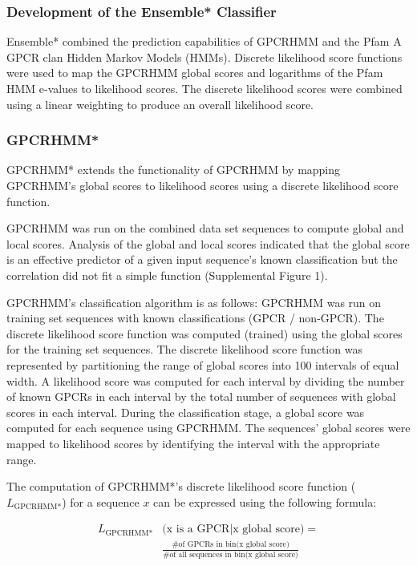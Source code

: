 \subsubsection{Development of the Ensemble* Classifier}

Ensemble* combined the prediction capabilities of GPCRHMM and the Pfam A GPCR clan Hidden Markov Models (HMMs).
Discrete likelihood score functions were used to map the GPCRHMM global scores and logarithms of the Pfam HMM e-values to likelihood scores.
The discrete likelihood scores were combined using a linear weighting to produce an overall likelihood score.

\subsubsection{GPCRHMM*}
GPCRHMM* extends the functionality of GPCRHMM by mapping GPCRHMM's global scores to likelihood scores using a discrete likelihood score function.

GPCRHMM was run on the combined data set sequences to compute global and local scores. Analysis of the global and local scores indicated that the global score is an effective predictor of a given input sequence's known classification but the correlation did not fit a simple function (Supplemental Figure 1).  

GPCRHMM's classification algorithm is as follows: GPCRHMM was run on training set sequences with known classifications (GPCR / non-GPCR). The discrete likelihood score function was computed (trained) using the global scores for the training set sequences. The discrete likelihood score function was represented by partitioning the range of global scores into 100 intervals of equal width. A likelihood score was computed for each interval by dividing the number of known GPCRs in each interval by the total number of sequences with global scores in each interval. During the classification stage, a global score was computed for each sequence using GPCRHMM.  The sequences' global scores were mapped to likelihood scores by identifying the interval with the appropriate range.


The computation of GPCRHMM*'s discrete likelihood score function ($L_{\text{GPCRHMM*}}$) for a sequence $x$ can be expressed using the following formula:

\begin{align*}
L_{\text{GPCRHMM*}}&\text{(x is a GPCR} | \text{x global score)} = \\
&\frac{\text{\# of GPCRs in bin(x global score)}}{\text{\# of all sequences in bin(x global score)}}
\end{align*} 

